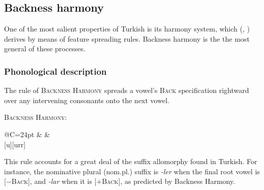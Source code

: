 \subsection{Backness harmony}

One of the most salient properties of Turkish is its harmony system, which \citeauthor{Lees1966b} (\citeyear[][35]{Lees1966b}, \citeyear[][284]{Lees1966a}) derives by means of feature spreading rules. Backness harmony is the the most general of these processes.

\subsubsection{Phonological description}

The rule of \textsc{Backness Harmony} spreads a vowel's \textsc{Back} specification rightward over any intervening consonants onto the next vowel.  

\begin{example}
\textsc{Backness Harmony}:

\xymatrix@R=24pt@C=24pt{
                                        &  &  \\
\ar@{-}[u]\ar@{--}[urr] \\
}
\end{example}

This rule accounts for a great deal of the suffix allomorphy found in Turkish. For instance, the nominative plural (nom.pl.) suffix is \emph{-ler} when the final root vowel is [$-$\textsc{Back}], and \emph{-lar} when it is [$+$\textsc{Back}], as predicted by Backness Harmony.

